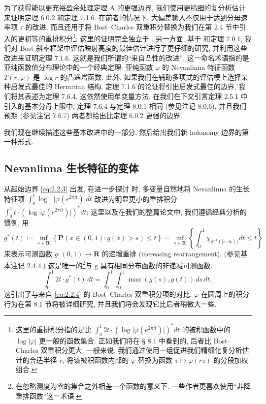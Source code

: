 为了获得能以更充裕盈余处理定理 A 的更强边界, 我们使用更精细的复分析估计来证明定理 6.0.2 和定理 7.1.6.
在前者的情况下, 大偏差输入不仅用于达到分母速率项 \(\tau\) 的改进, 
而且还用于将 Bost--Charles 双重积分替换为我们在第 2.4 节中引入的更初等的重排积分\footnote{这里的重排积分指的是比 $\int_0^1 2t \cdot (\log \lvert\varphi(e^{2\pi it})\rvert)^* dt$ 的被积函数中的 $\log \lvert\varphi\rvert$ 更一般的函数集合. 正如我们将在 § 8.1 中看到的, 后者比 Bost--Charles 双重积分更大. 一般来说, 我们通过使用一组促进我们精细化复分析估计的合适半径 $r$, 将该被积函数内部的 $\varphi$ 替换为函数 $z \mapsto \varphi(rz)$ 的分段加权组合.}; 
这里的证明完全独立于 \cite{BC22}.
另一方面, 基于 \cite{BC22} 和定理 7.0.1, 我们对 Bost 斜率框架中评估映射高度的最佳估计进行了更仔细的研究, 
并利用这些改进来证明定理 7.1.6. 
这就是我们所谓的``来自凸性的改进'', 这一命名术语指的是亚纯函数值分布理论中的一个经典定理: 
亚纯函数 \(\varphi\) 的 Nevanlinna 特征函数 \(T(r,\varphi)\) 是 \(\log r\) 的凸递增函数.
此外, 如果我们在辅助多项式的评估模上选择某种启发式最佳的 Hermitian 结构, 
定理 7.1.6 的论证将引出启发式最佳的边界, 我们将其表述为定理 7.6.4, 这依然使用单变量方法.
在我们在下文引言定理 2.5.1 中引入的基本分母上限中, 定理 7.6.4 与定理 8.0.1 相同 (参见注记 8.0.6), 
并且我们预期 (参见注记 7.6.7) 两者都给出比定理 6.0.2 更强的边界.

我们现在继续描述这些基本改进中的一部分, 然后给出我们新 holonomy 边界的第一种形式.

\subsection{Nevanlinna 生长特征的变体}\label{sec:2.4}

从起始边界 \eqref{eq:2.2.3} 出发, 在进一步探讨 \cite[Remark 2.3.3]{CDT21} 时, 
多变量自然地将 Nevanlinna 的生长特征项 \(\int_0^1 \log^+ \lvert\varphi(e^{2\pi i t})\rvert dt\) 
改进为明显更小的重排积分 \(\int_0^1 t \cdot (\log \lvert\varphi(e^{2\pi i t})\rvert)^* dt\); 
这里以及在我们的整篇论文中, 我们遵循经典分析的惯例, 用
\begin{equation}\label{eq:2.4.1}
g^{*}(t) := \inf_{s \in \mathbf{R}} \left\{ \mathbf{P} \left( x \in (0,1) : g(x) > s \right) \le t \right\} = \inf_{s \in \mathbf{R}} \left\{ \int_{0}^{1} \chi_{g^{-1}([s,\infty))} dt \le t \right\}
\end{equation}
来表示可测函数 \(g:(0,1)\to \mathbf{R}\) 的递增重排 (increasing rearrangement).
(参见基本注记 2.4.4.) 
这是唯一的\footnote{在忽略测度为零的集合之外相差一个函数的意义下. 一些作者更喜欢使用“非降重排函数”这一术语.}与 g 具有相同分布函数的非递减可测函数.
\begin{equation}\label{eq:2.4.2}
\int_0^1 2t \cdot g^*(t) \, dt = \int_0^1 \int_0^1 \max(g(s), g(t)) \, ds \, dt,
\end{equation}
这引出了与来自 \eqref{eq:2.2.4} 的 Bost--Charles 双重积分项的对比.
\(\varphi\) 在圆周上的积分行为在第 8.1 节将被详细研究, 并且我们将会发现它比后者稍微大一些.

